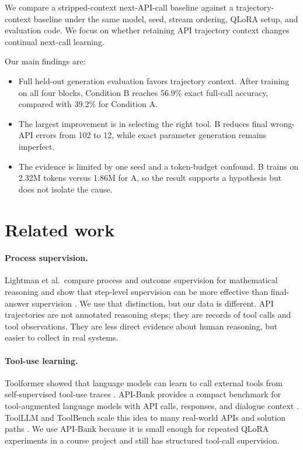 \documentclass{article}
\begin{document}
We compare a stripped-context next-API-call baseline against a trajectory-context baseline under the same model, seed, stream ordering, QLoRA setup, and evaluation code. We focus on whether retaining API trajectory context changes continual next-call learning.

Our main findings are:
\begin{itemize}[leftmargin=*]
    \item Full held-out generation evaluation favors trajectory context. After training on all four blocks, Condition B reaches 56.9\% exact full-call accuracy, compared with 39.2\% for Condition A.
    \item The largest improvement is in selecting the right tool. B reduces final wrong-API errors from 102 to 12, while exact parameter generation remains imperfect.
    \item The evidence is limited by one seed and a token-budget confound. B trains on 2.32M tokens versus 1.86M for A, so the result supports a hypothesis but does not isolate the cause.
\end{itemize}

\section{Related work}

\paragraph{Process supervision.}
Lightman et al.\ compare process and outcome supervision for mathematical reasoning and show that step-level supervision can be more effective than final-answer supervision \citep{lightman2023verify}. We use that distinction, but our data is different. API trajectories are not annotated reasoning steps; they are records of tool calls and tool observations. They are less direct evidence about human reasoning, but easier to collect in real systems.

\paragraph{Tool-use learning.}
Toolformer showed that language models can learn to call external tools from self-supervised tool-use traces \citep{schick2023toolformer}. API-Bank provides a compact benchmark for tool-augmented language models with API calls, responses, and dialogue context \citep{li2023apibank}. ToolLLM and ToolBench scale this idea to many real-world APIs and solution paths \citep{qin2023toolllm}. We use API-Bank because it is small enough for repeated QLoRA experiments in a course project and still has structured tool-call supervision.
\end{document}
